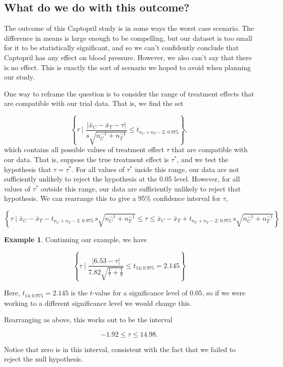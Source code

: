 \documentclass[
  openany]{book}
\theoremstyle{definition}
\theoremstyle{definition}
\newtheorem{example}{Example}[chapter]
\theoremstyle{definition}
\theoremstyle{definition}
\theoremstyle{remark}
\begin{document}
\subsection{What do we do with this outcome?}\label{what-do-we-do-with-this-outcome}

The outcome of this Captopril study is in some ways the worst case scenario. The difference in means is large enough to be compelling, but our dataset is too small for it to be statistically significant, and so we can't confidently conclude that Captopril has any effect on blood pressure. However, we also can't say that there is no effect. This is exactly the sort of scenario we hoped to avoid when planning our study.

One way to reframe the question is to consider the range of treatment effects that are compatible with our trial data. That is, we find the set

\[\left\lbrace \tau \mid \frac{\lvert \bar{x}_C - \bar{x}_T - \tau \rvert}{s\sqrt{n_C^{-1} + n_T^{-1}}} \leq t_{n_C+n_T-2;\,0.975} \right\rbrace, \]
which contains all possible values of treatment effect \(\tau\) that are compatible with our data. That is, suppose the true treatment effect is \(\tau^*\), and we test the hypothesis that \(\tau = \tau^*\). For all values of \(\tau^*\) inside this range, our data are not sufficiently unlikely to reject the hypothesis at the 0.05 level. However, for all values of \(\tau^*\) outside this range, our data are sufficiently unlikely to reject that hypothesis. We can rearrange this to give a 95\% confidence interval for \(\tau\),

\[\left\lbrace \tau \mid \bar{x}_C - \bar{x}_T - t_{n_C+n_T-2;\,0.975}\,s\sqrt{n_C^{-1} + n_T^{-1}} \leq \tau \leq \bar{x}_C - \bar{x}_T + t_{n_C+n_T-2;\,0.975}\,s\sqrt{n_C^{-1} + n_T^{-1}}  \right\rbrace \]

\begin{example}
Continuing our example, we have

\[\left\lbrace \tau \mid \frac{\lvert 6.53 - \tau \rvert}{7.82\sqrt{\frac{1}{7} + \frac{1}{9}}} \leq t_{14;0.975} = 2.145 \right\rbrace \]

Here, \(t_{14;0.975} = 2.145\) is the \(t\)-value for a significance level of \(0.05\), so if we were working to a different significance level we would change this.

Rearranging as above, this works out to be the interval

\[
-1.92 \leq  \tau \leq 14.98.
\]

Notice that zero is in this interval, consistent with the fact that we failed to reject the null hypothesis.
\end{example}
\end{document}

